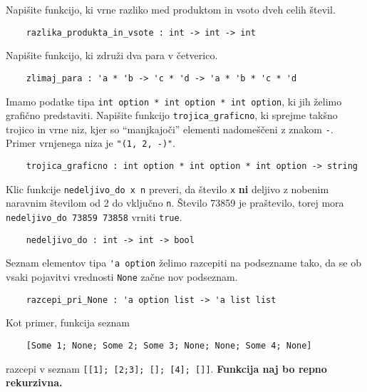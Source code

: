 \documentclass[arhiv]{../izpit}
\begin{document}

\naloga

\podnaloga
Napišite funkcijo, ki vrne razliko med produktom in vsoto dveh celih števil.
\begin{verbatim}
    razlika_produkta_in_vsote : int -> int -> int
\end{verbatim}

\podnaloga
Napišite funkcijo, ki združi dva para v četverico.
\begin{verbatim}
    zlimaj_para : 'a * 'b -> 'c * 'd -> 'a * 'b * 'c * 'd
\end{verbatim}

\podnaloga
Imamo podatke tipa \verb|int option * int option * int option|, ki jih želimo grafično predstaviti. Napišite funkcijo \verb|trojica_graficno|, ki sprejme takšno trojico in vrne niz, kjer so ``manjkajoči'' elementi nadomeščeni z znakom \verb|-|. Primer vrnjenega niza je \verb|"(1, 2, -)"|.
\begin{verbatim}
    trojica_graficno : int option * int option * int option -> string
\end{verbatim}

\podnaloga
Klic funkcije \verb|nedeljivo_do x n| preveri, da število \verb|x| \textbf{ni} deljivo z nobenim naravnim številom od 2 do vključno \verb|n|. Število 73859 je praštevilo, torej mora \verb|nedeljivo_do 73859 73858| vrniti \verb|true|.
\begin{verbatim}
    nedeljivo_do : int -> int -> bool
\end{verbatim}

\podnaloga
Seznam elementov tipa \verb|'a option| želimo razcepiti na podsezname tako, da se ob vsaki pojavitvi vrednosti \verb|None| začne nov podseznam.
\begin{verbatim}
    razcepi_pri_None : 'a option list -> 'a list list
\end{verbatim}
Kot primer, funkcija seznam
\begin{verbatim}
    [Some 1; None; Some 2; Some 3; None; None; Some 4; None]
\end{verbatim}
razcepi v seznam \verb|[[1]; [2;3]; []; [4]; []]|. \textbf{Funkcija naj bo repno rekurzivna.}


\naloga
\end{document}
